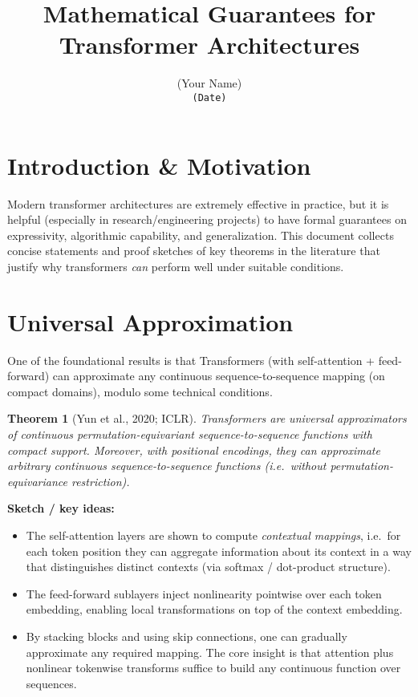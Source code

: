 \documentclass[11pt]{article}
\title{Mathematical Guarantees for Transformer Architectures}
\author{(Your Name) \\ \texttt{(Date)}}
\date{}
\newtheorem{theorem}{Theorem}
\begin{document}
\maketitle

\section{Introduction \& Motivation}
Modern transformer architectures are extremely effective in practice, but it is helpful (especially in research/engineering projects) to have formal guarantees on expressivity, algorithmic capability, and generalization. This document collects concise statements and proof sketches of key theorems in the literature that justify why transformers {\em can} perform well under suitable conditions.

\section{Universal Approximation}
One of the foundational results is that Transformers (with self-attention + feed-forward) can approximate any continuous sequence-to-sequence mapping (on compact domains), modulo some technical conditions.

\begin{theorem}[Yun et al., 2020; ICLR]
Transformers are universal approximators of continuous permutation-equivariant sequence-to-sequence functions with compact support. Moreover, with positional encodings, they can approximate \emph{arbitrary} continuous sequence-to-sequence functions (i.e.\ without permutation-equivariance restriction).  
\end{theorem}

\noindent\textbf{Sketch / key ideas:}
\begin{itemize}
  \item The self-attention layers are shown to compute \emph{contextual mappings}, i.e.\ for each token position they can aggregate information about its context in a way that distinguishes distinct contexts (via softmax / dot-product structure).  
  \item The feed-forward sublayers inject nonlinearity pointwise over each token embedding, enabling local transformations on top of the context embedding.  
  \item By stacking blocks and using skip connections, one can gradually approximate any required mapping. The core insight is that attention plus nonlinear tokenwise transforms suffice to build any continuous function over sequences.  
\end{itemize}
\end{document}
